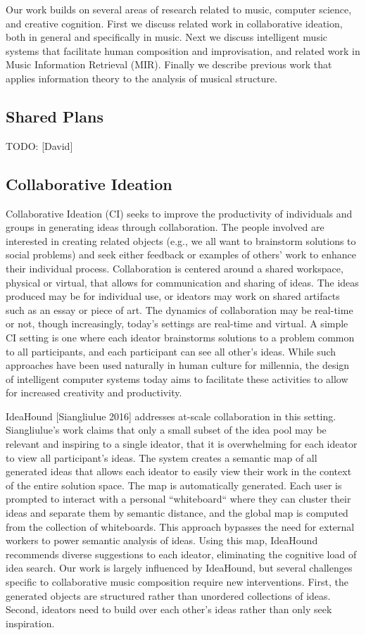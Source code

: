 \documentclass[final,authoryear,11pt,times]{elsarticle}
\begin{document}
Our work builds on several areas of research related to music, computer science, and creative cognition. First we discuss related work in collaborative ideation, both in general and specifically in music. Next we discuss intelligent 
music systems that facilitate human composition and improvisation, and related work in Music Information Retrieval (MIR). Finally we describe previous work that applies information theory to the analysis of musical structure.

\subsection{Shared Plans}
TODO: [David]

\subsection{Collaborative Ideation}

Collaborative Ideation (CI) seeks to improve the productivity of individuals and groups in generating ideas through collaboration. The people involved are interested in creating related objects (e.g., we all want to brainstorm solutions to social problems) and seek either feedback or examples of others' work to enhance their individual process. Collaboration is centered around a shared workspace, physical or virtual, that allows for communication and sharing of ideas. The ideas produced may be for individual use, or ideators may work on shared artifacts such as an essay or piece of art. The dynamics of collaboration may be real-time or not, though increasingly, today's settings are real-time and virtual. A simple CI setting is one where each ideator brainstorms solutions to a problem common to all participants, and each participant can see all other's ideas. While such approaches have been used naturally in human culture for millennia, the design of intelligent computer systems today aims to facilitate these activities to allow for increased creativity and productivity. 

IdeaHound [Siangliulue 2016] addresses at-scale collaboration in this setting. Siangliulue's work claims that only a small subset of the idea pool may be relevant and inspiring to a single ideator, that it is overwhelming for each ideator to view all participant's ideas. The system creates a semantic map of all generated ideas that allows each ideator to easily view their work in the context of the entire solution space. The map is automatically generated. Each user is prompted to interact with a personal ``whiteboard`` where they can cluster their ideas and separate them by semantic distance, and the global map is computed from the collection of whiteboards. This approach bypasses the need for external workers to power semantic analysis of ideas.  Using this map, IdeaHound recommends diverse suggestions to each ideator, eliminating the cognitive load of idea search. Our work is largely influenced by IdeaHound, but several challenges specific to collaborative music composition require new interventions. First, the generated objects are structured rather than unordered collections of ideas. Second, ideators need to build over each other's ideas rather than only seek inspiration.
\end{document}
